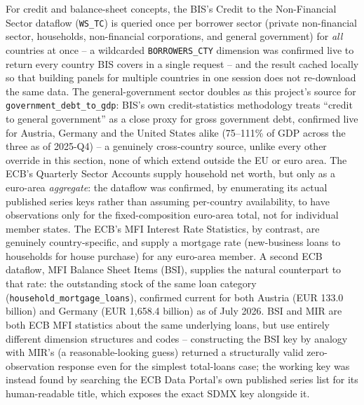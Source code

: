 \documentclass[11pt]{article}
\begin{document}
For credit and balance-sheet concepts, the BIS's Credit to the
Non-Financial Sector dataflow (\texttt{WS\_TC}) is queried once per
borrower sector (private non-financial sector, households, non-financial
corporations, and general government) for \emph{all} countries at once --
a wildcarded \texttt{BORROWERS\_CTY} dimension was confirmed live to
return every country BIS covers in a single request -- and the result
cached locally so that building panels for multiple countries in one
session does not
re-download the same data. The general-government sector doubles as this
project's source for \texttt{government\_debt\_to\_gdp}: BIS's own
credit-statistics methodology treats ``credit to general government'' as
a close proxy for gross government debt, confirmed live for Austria,
Germany and the United States alike (75--111\% of GDP across the three
as of 2025-Q4) -- a genuinely cross-country source, unlike every other
override in this section, none of which extend outside the EU or euro
area. The ECB's Quarterly Sector Accounts supply
household net worth, but only as a euro-area \emph{aggregate}: the
dataflow was confirmed, by enumerating its actual published series keys
rather than assuming per-country availability, to have observations only
for the fixed-composition euro-area total, not for individual member
states. The ECB's MFI Interest Rate Statistics, by contrast, are genuinely
country-specific, and supply a mortgage rate (new-business loans to
households for house purchase) for any euro-area member. A second ECB
dataflow, MFI Balance Sheet Items (BSI), supplies the natural counterpart
to that rate: the outstanding stock of the same loan category
(\texttt{household\_mortgage\_loans}), confirmed current for both Austria
(EUR 133.0 billion) and Germany (EUR 1{,}658.4 billion) as of July 2026.
BSI and MIR are both ECB MFI statistics about the same underlying loans,
but use entirely different dimension structures and codes -- constructing
the BSI key by analogy with MIR's (a reasonable-looking guess) returned a
structurally valid zero-observation response even for the simplest
total-loans case; the working key was instead found by searching the ECB
Data Portal's own published series list for its human-readable title,
which exposes the exact SDMX key alongside it.
\end{document}
